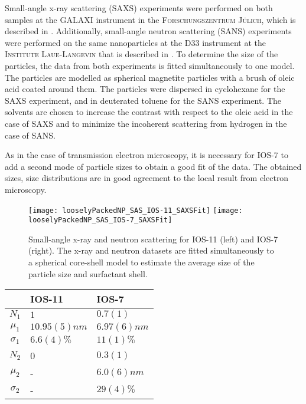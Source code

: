 \documentclass[\main/dresen_thesis.tex]{subfiles}
\begin{document}
Small-angle x-ray scattering (SAXS) experiments were performed on both samples at the \textsc{GALAXI} instrument in the \textsc{Forschungszentrum J\"ulich}, which is described in .
Additionally, small-angle neutron scattering (SANS) experiments were performed on the same nanoparticles at the \textsc{D33} instrument at the \textsc{Institute Laue-Langevin} that is described in .
To determine the size of the particles, the data from both experiments is fitted simultaneously to one model.
The particles are modelled as spherical magnetite particles with a brush of oleic acid coated around them.
The particles were dispersed in cyclohexane for the SAXS experiment, and in deuterated toluene for the SANS experiment.
The solvents are chosen to increase the contrast with respect to the oleic acid in the case of SAXS and to minimize the incoherent scattering from hydrogen in the case of SANS.

As in the case of transmission electron microscopy, it is necessary for IOS-7 to add a second mode of particle sizes to obtain a good fit of the data.
The obtained sizes, size distributions are in good agreement to the local result from electron microscopy.


\begin{figure}[tb]
  \centering
  \texttt{[image: looselyPackedNP\_SAS\_IOS-11\_SAXSFit]}
  \texttt{[image: looselyPackedNP\_SAS\_IOS-7\_SAXSFit]}
  \caption{\label{fig:looselyPackedNP:nanoparticle:sas}Small-angle x-ray and neutron scattering for IOS-11 (left) and IOS-7 (right). The x-ray and neutron datasets are fitted simultaneously to a spherical core-shell model to estimate the average size of the particle size and surfactant shell.}
\end{figure}

\begin{table}[tb]
  \centering
  \begin{tabular}{ c | l | l }
      & IOS-11 & IOS-7 \\
    \hline
    $N_1$       & $1$                   & $0.7(1)$   \\
    $\mu_1$     & $10.95(5) \unit{nm}$  & $6.97(6) \unit{nm}$ \\
    $\sigma_1$  & $6.6(4) \unit{\%}$    & $11(1) \unit{\%}$ \\
    $N_2$       & 0                     & $0.3(1)$  \\
    $\mu_2$     & -                     & $6.0(6) \unit{nm}$ \\
    $\sigma_2$  & -                     & $29(4) \unit{\%}$ \\
    \hline
  \end{tabular}
\end{table}
\end{document}
